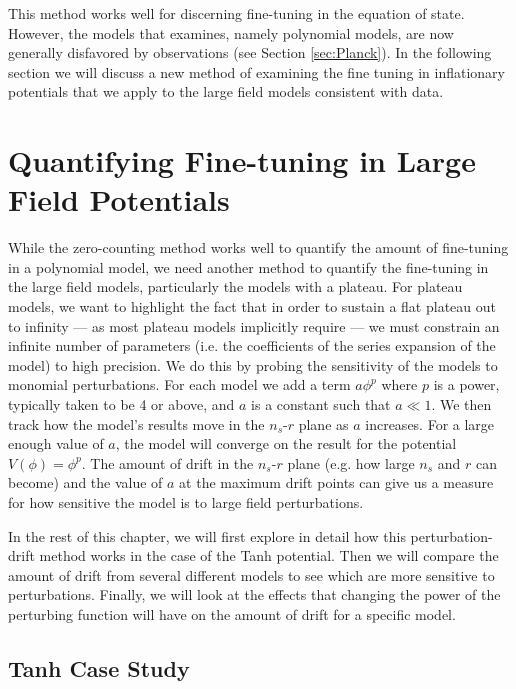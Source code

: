 \documentclass[a4paper,11pt]{article}
\def\nsr{$n_s$-$r$ }
\begin{document}
    This method works well for discerning fine-tuning in the equation of state. However, the models that \citet{Boyle+2006} examines, namely polynomial models, are now generally disfavored by observations (see Section \ref{sec:Planck}). In the following section we will discuss a new method of examining the fine tuning in inflationary potentials that we apply to the large field models consistent with \citet{Planck2015} data.

\newpage
\section{Quantifying Fine-tuning in Large Field Potentials}
\label{sec:LFP}

While the zero-counting method works well to quantify the amount of fine-tuning in a polynomial model, we need another method to quantify the fine-tuning in the large field models, particularly the models with a plateau. For plateau models, we want to highlight the fact that in order to sustain a flat plateau out to infinity --- as most plateau models implicitly require --- we must constrain an infinite number of parameters (i.e. the coefficients of the series expansion of the model) to high precision. We do this by probing the sensitivity of the models to monomial perturbations. For each model we add a term $a\phi^p$ where $p$ is a power, typically taken to be 4 or above, and $a$ is a constant such that $a\ll 1$. We then track how the model's results move in the \nsr plane as $a$ increases. For a large enough value of $a$, the model will converge on the result for the potential $V(\phi)=\phi^p$. The amount of drift in the \nsr plane (e.g. how large $n_s$ and $r$ can become) and the value of $a$ at the maximum drift points can give us a measure for how sensitive the model is to large field perturbations. 

In the rest of this chapter, we will first explore in detail how this perturbation-drift method works in the case of the Tanh potential. Then we will compare the amount of drift from several different models to see which are more sensitive to perturbations. Finally, we will look at the effects that changing the power of the perturbing function will have on the amount of drift for a specific model. 

\subsection{Tanh Case Study}
\label{ssec:TanhCaseStudy}
\end{document}
